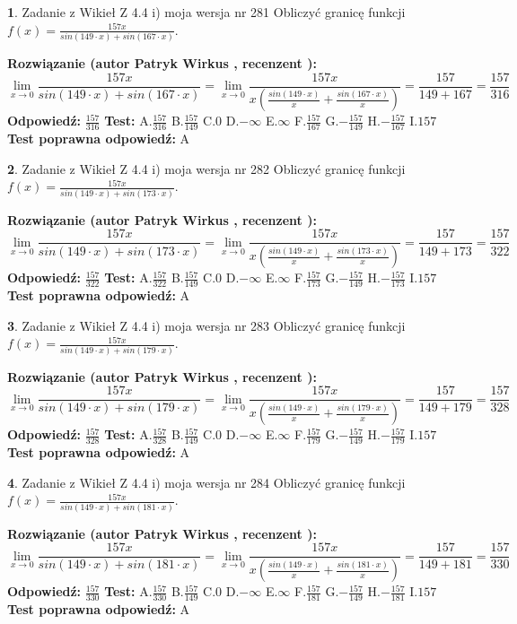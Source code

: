 \documentclass[12pt, a4paper]{article}
\theoremstyle{definition} %
\newtheorem{zad}{}
\newcommand{\zadStart}[1]{\begin{zad}#1\newline}
\newcommand{\zadStop}{\end{zad}}
\newcommand{\rozwStart}[2]{\noindent \textbf{Rozwiązanie (autor #1 , recenzent #2): }\newline}
\newcommand{\rozwStop}{\newline}
\newcommand{\odpStart}{\noindent \textbf{Odpowiedź:}\newline}
\newcommand{\odpStop}{\newline}
\newcommand{\testStart}{\noindent \textbf{Test:}\newline}
\newcommand{\testStop}{\newline}
\newcommand{\kluczStart}{\noindent \textbf{Test poprawna odpowiedź:}\newline}
\newcommand{\kluczStop}{\newline}
\begin{document}
\zadStart{Zadanie z Wikieł Z 4.4 i) moja wersja nr 281}
Obliczyć granicę funkcji $f(x)=\frac{157x}{sin(149\cdot x) +sin(167\cdot x)}$.
\zadStop
\rozwStart{Patryk Wirkus}{}
$$\lim\limits_{x\to 0}\frac{157x}{sin(149\cdot x) +sin(167\cdot x)}=\lim\limits_{x\to 0}\frac{157x}{x(\frac{sin(149\cdot x)}{x}+\frac{sin(167\cdot x)}{x})}=\frac{157}{149+167} = \frac{157}{316}$$
\rozwStop
\odpStart
$\frac{157}{316}$
\odpStop
\testStart
A.$\frac{157}{316}$
B.$\frac{157}{149}$
C.$0$
D.$-\infty$
E.$\infty$
F.$\frac{157}{167}$
G.$-\frac{157}{149}$
H.$-\frac{157}{167}$
I.$157$
\testStop
\kluczStart
A
\kluczStop



\zadStart{Zadanie z Wikieł Z 4.4 i) moja wersja nr 282}
Obliczyć granicę funkcji $f(x)=\frac{157x}{sin(149\cdot x) +sin(173\cdot x)}$.
\zadStop
\rozwStart{Patryk Wirkus}{}
$$\lim\limits_{x\to 0}\frac{157x}{sin(149\cdot x) +sin(173\cdot x)}=\lim\limits_{x\to 0}\frac{157x}{x(\frac{sin(149\cdot x)}{x}+\frac{sin(173\cdot x)}{x})}=\frac{157}{149+173} = \frac{157}{322}$$
\rozwStop
\odpStart
$\frac{157}{322}$
\odpStop
\testStart
A.$\frac{157}{322}$
B.$\frac{157}{149}$
C.$0$
D.$-\infty$
E.$\infty$
F.$\frac{157}{173}$
G.$-\frac{157}{149}$
H.$-\frac{157}{173}$
I.$157$
\testStop
\kluczStart
A
\kluczStop



\zadStart{Zadanie z Wikieł Z 4.4 i) moja wersja nr 283}
Obliczyć granicę funkcji $f(x)=\frac{157x}{sin(149\cdot x) +sin(179\cdot x)}$.
\zadStop
\rozwStart{Patryk Wirkus}{}
$$\lim\limits_{x\to 0}\frac{157x}{sin(149\cdot x) +sin(179\cdot x)}=\lim\limits_{x\to 0}\frac{157x}{x(\frac{sin(149\cdot x)}{x}+\frac{sin(179\cdot x)}{x})}=\frac{157}{149+179} = \frac{157}{328}$$
\rozwStop
\odpStart
$\frac{157}{328}$
\odpStop
\testStart
A.$\frac{157}{328}$
B.$\frac{157}{149}$
C.$0$
D.$-\infty$
E.$\infty$
F.$\frac{157}{179}$
G.$-\frac{157}{149}$
H.$-\frac{157}{179}$
I.$157$
\testStop
\kluczStart
A
\kluczStop



\zadStart{Zadanie z Wikieł Z 4.4 i) moja wersja nr 284}
Obliczyć granicę funkcji $f(x)=\frac{157x}{sin(149\cdot x) +sin(181\cdot x)}$.
\zadStop
\rozwStart{Patryk Wirkus}{}
$$\lim\limits_{x\to 0}\frac{157x}{sin(149\cdot x) +sin(181\cdot x)}=\lim\limits_{x\to 0}\frac{157x}{x(\frac{sin(149\cdot x)}{x}+\frac{sin(181\cdot x)}{x})}=\frac{157}{149+181} = \frac{157}{330}$$
\rozwStop
\odpStart
$\frac{157}{330}$
\odpStop
\testStart
A.$\frac{157}{330}$
B.$\frac{157}{149}$
C.$0$
D.$-\infty$
E.$\infty$
F.$\frac{157}{181}$
G.$-\frac{157}{149}$
H.$-\frac{157}{181}$
I.$157$
\testStop
\kluczStart
A
\kluczStop
\end{document}
